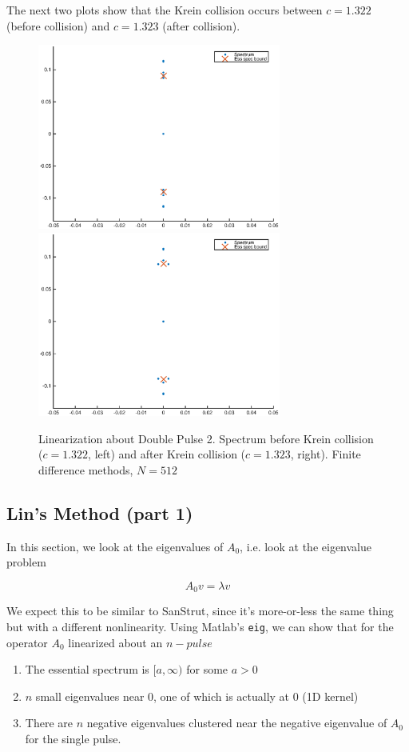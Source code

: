 \documentclass[12pt]{article}
\begin{document}
The next two plots show that the Krein collision occurs between $c = 1.322$ (before collision) and $c = 1.323$ (after collision).

\begin{figure}[H]
\centering
\includegraphics[width=8cm]{spec1322_double2.eps}
\includegraphics[width=8cm]{spec1323_double2.eps}
\caption{Linearization about Double Pulse 2. Spectrum before Krein collision ($c = 1.322$, left) and after Krein collision ($c = 1.323$, right). Finite difference methods, $N = 512$}
\end{figure}

\subsection{Lin's Method (part 1)}

In this section, we look at the eigenvalues of $A_0$, i.e. look at the eigenvalue problem

\[
A_0 v = \lambda v
\]

We expect this to be similar to SanStrut, since it's more-or-less the same thing but with a different nonlinearity. Using Matlab's \texttt{eig}, we can show that for the operator $A_0$ linearized about an $n-pulse$

\begin{enumerate}
	\item The essential spectrum is $[a, \infty)$ for some $a > 0$
	\item $n$ small eigenvalues near 0, one of which is actually at 0 (1D kernel)
	\item There are $n$ negative eigenvalues clustered near the negative eigenvalue of $A_0$ for the single pulse.
\end{enumerate}
\end{document}
